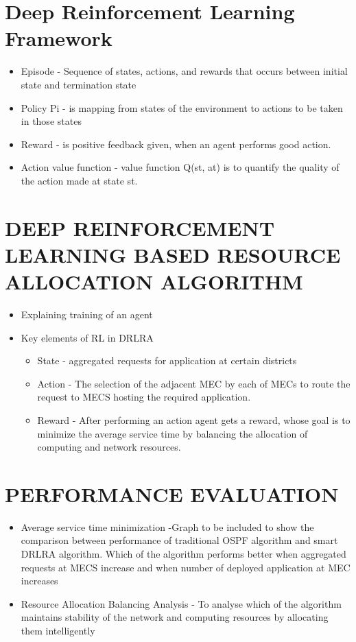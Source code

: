\section{Deep Reinforcement Learning Framework}
\label{sec:Deep Reinforcement Learning Framework:}
\begin{itemize}
    \item Episode - Sequence of states, actions, and rewards that occurs between initial state and termination state
    \item Policy Pi - is mapping from states of the environment to actions to be taken in those states \cite{Policy:_RL}
    \item Reward - is positive feedback given, when an agent performs good action.
    \item Action value function - value function Q(st, at) is to quantify the quality of the action made at state st.  \cite {Qrash:_DQN} 
\end{itemize}


\section{ DEEP REINFORCEMENT LEARNING BASED RESOURCE ALLOCATION ALGORITHM}
\label{sec:  DEEP REINFORCEMENT LEARNING BASED RESOURCE ALLOCATION ALGORITHM}
\begin{itemize}
    \item {Explaining training of an agent} 
    \item {Key elements of RL in DRLRA}
    \begin{itemize}
        \item {State} - aggregated requests for application at certain districts
        \item {Action} - The selection of the adjacent MEC by each of MECs to route the request to MECS hosting the required application.
        \item{Reward} - After performing an action agent gets a reward, whose goal is to minimize the average service time by balancing the allocation of computing and network resources.
    \end{itemize}
\end{itemize}


\section{PERFORMANCE EVALUATION}
\label{sec:PERFORMANCE EVALUATION}
\begin{itemize}
    \item {Average service time minimization} -Graph to be included to show the comparison between performance of traditional OSPF algorithm and smart DRLRA algorithm. Which of the algorithm performs better when aggregated requests at MECS increase and when number of deployed application at MEC increases
    \item{Resource Allocation Balancing Analysis} - To analyse which of the algorithm maintains stability of the network and computing resources by allocating them intelligently 
\end{itemize}

